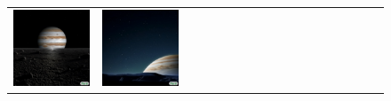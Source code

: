 \begin{figure}[ht!]
\begin{adjustwidth}{-0.8in}{-0.5in}
\begin{tabular}{cccccccccccccccccccc}
\multicolumn{2}{c}{\includegraphics[width=\threebythreecolwidth\textwidth]{figures/cherries/jupiter1.jpg}} &
\multicolumn{2}{c}{\includegraphics[width=\threebythreecolwidth\textwidth]{figures/cherries/jupiter2.jpg}} &

\end{tabular}
\end{adjustwidth}
\end{figure}
